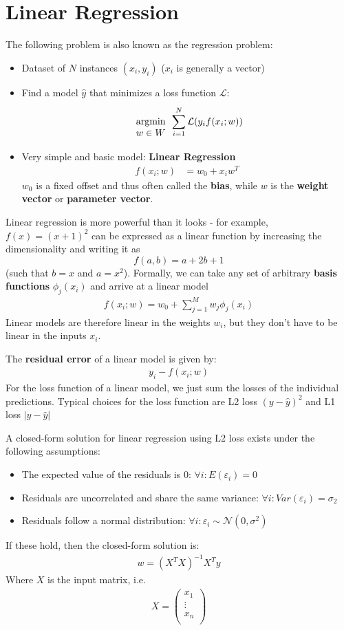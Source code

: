 \documentclass{report}
\renewcommand\epsilon{\varepsilon}
\newcommand{\tbf}{\textbf}
\newcommand{\argmin}[1] {
    \begin{array}{c}
        \vphantom{#1}\\ %
        \text{argmin}\\
        #1\\
        \end{array}
    }
\newcommand*{\newpar}{\par\vspace{\baselineskip}\noindent}
\newcommand{\loss}{\mathcal{L}}
\newcommand{\yhat}{\hat{y}}
\begin{document}
\section{Linear Regression}
The following problem is also known as the regression problem:
\begin{itemize}
 \item Dataset of $N$ instances $(x_i, y_i)$ ($x_i$ is generally a vector) 
 \item Find a model $\yhat$ that minimizes a loss function $\loss$:
 \begin{align*}
  \argmin{w \in W} \sum_{i=1}^{N} \loss(y_i f(x_i; w))
 \end{align*}
 \item Very simple and basic model: \tbf{Linear Regression}
 \begin{align*}
  f(x_i;w) &= w_0 + x_i w^{T}
 \end{align*}
 $w_0$ is a fixed offset and thus often called the \tbf{bias}, while $w$ is the \tbf{weight vector} or \tbf{parameter vector}.
\end{itemize}
Linear regression is more powerful than it looks - for example, $f(x) = (x+1)^2$ can be expressed as a linear function by increasing the dimensionality and writing it as \[f(a,b) = a +2b + 1\] (such that $b = x$ and $a = x^2$). Formally, we can take any set of arbitrary \tbf{basis functions} $\phi_j(x_i)$ and arrive at a linear model
\begin{align*}
 f(x_i;w) = w_0 + \sum_{j=1}^{M} w_j \phi_j(x_i)
\end{align*}
Linear models are therefore linear in the weights $w_i$, but they don't have to be linear in the inputs $x_i$.
\newpar
The \tbf{residual error} of a linear model is given by:
\begin{align*}
 y_i - f(x_i;w)
\end{align*}
For the loss function of a linear model, we just sum the losses of the individual predictions. Typical choices for the loss function are L2 loss $(y-\yhat)^2$ and L1 loss $|y - \yhat|$
\newpar
A closed-form solution for linear regression using L2 loss exists under the following assumptions:
\begin{itemize}
 \item The expected value of the residuals is 0: $\forall i: E(\epsilon_i) = 0$
 \item Residuals are uncorrelated and share the same variance: $\forall i: Var(\epsilon_i) = \sigma_2$
 \item Residuals follow a normal distribution: $\forall i: \epsilon_i \sim \mathcal{N}(0,\sigma^2)$
\end{itemize}
If these hold, then the closed-form solution is:
\begin{align}
 w = (X^T X)^{-1} X^T y
\end{align}
Where $X$ is the input matrix, i.e.
\begin{align*}
X = 
\begin{pmatrix}
x_1\\
\vdots\\
x_n\\
\end{pmatrix}
\end{align*}
\end{document}

